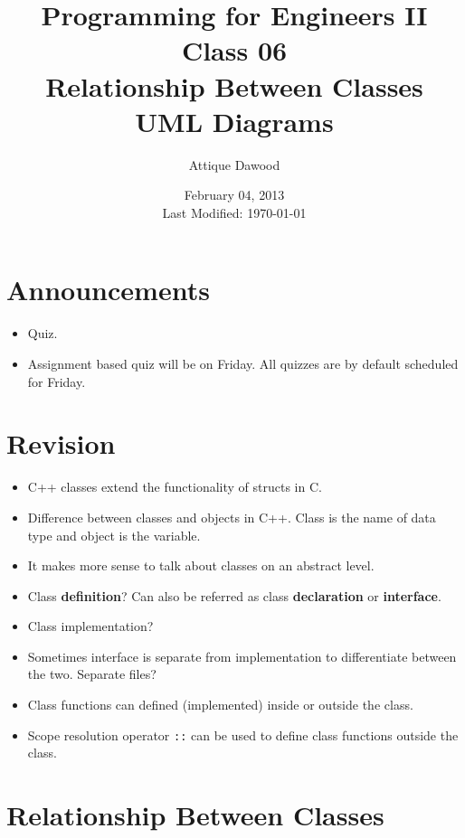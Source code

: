 \documentclass[12pt,a4paper]{article}
\title{\vspace{-2cm}Programming for Engineers II\\Class 06\\Relationship Between Classes\\UML Diagrams}
\author{Attique Dawood}
\date{February 04, 2013\\[0.2cm] Last Modified: \today}
\begin{document}
\maketitle
\section{Announcements}
\begin{itemize}
\item Quiz.
\item Assignment based quiz will be on Friday. All quizzes are by default scheduled for Friday.
\end{itemize}
\section{Revision}
\begin{itemize}
\item C++ classes extend the functionality of structs in C.
\item Difference between classes and objects in C++. Class is the name of data type and object is the variable.
\item It makes more sense to talk about classes on an abstract level.
\item Class \textbf{definition}? Can also be referred as class \textbf{declaration} or \textbf{interface}.
\item Class implementation?
\item Sometimes interface is separate from implementation to differentiate between the two. Separate files?
\item Class functions can defined (implemented) inside or outside the class.
\item Scope resolution operator \verb|::| can be used to define class functions outside the class.
\end{itemize}
\section{Relationship Between Classes}
\end{document}
